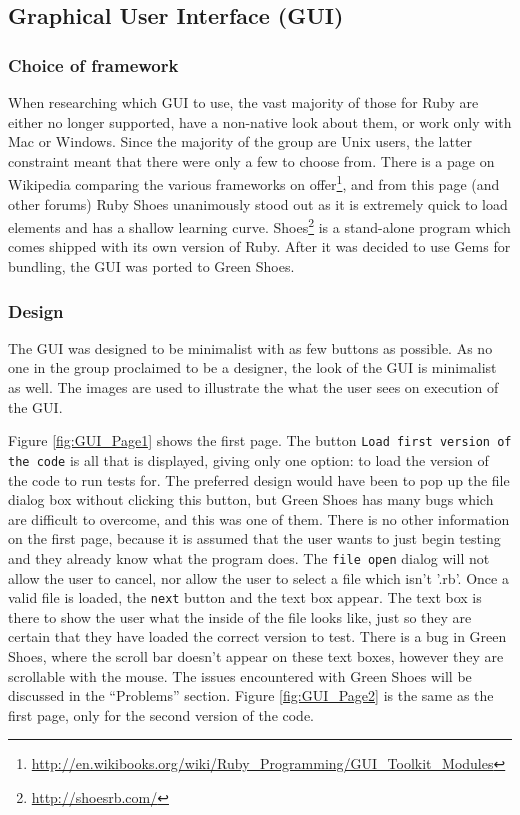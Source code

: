   \subsection{Graphical User Interface (GUI)}
  \subsubsection{Choice of framework}
  When researching which GUI to use, the vast majority of those for Ruby are either no longer supported, have a non-native look about them, or work only with Mac or Windows. Since the majority of the group are Unix users, the latter constraint meant that there were only a few to choose from. There is a page on Wikipedia comparing the various frameworks on offer\footnote{\url{http://en.wikibooks.org/wiki/Ruby_Programming/GUI_Toolkit_Modules}}, and from this page (and other forums) Ruby Shoes unanimously stood out as it is extremely quick to load elements and has a shallow learning curve.
  Shoes\footnote{\url{http://shoesrb.com/}} is a stand-alone program which comes shipped with its own version of Ruby. After it was decided to use Gems for bundling, the GUI was ported to Green Shoes.
  
  \subsubsection{Design}
  The GUI was designed to be minimalist with as few buttons as possible. As no one in the group proclaimed to be a designer, the look of the GUI is minimalist as well. The images are used to illustrate the what the user sees on execution of the GUI.
  
  Figure \ref{fig:GUI_Page1} shows the first page. The button \verb+Load first version of the code+ is all that is displayed, giving only one option: to load the version of the code to run tests for. The preferred design would have been to pop up the file dialog box without clicking this button, but Green Shoes has many bugs which are difficult to overcome, and this was one of them. There is no other information on the first page, because it is assumed that the user wants to just begin testing and they already know what the program does. The \verb+file open+ dialog will not allow the user to cancel, nor allow the user to select a file which isn't '.rb'. Once a valid file is loaded, the \verb+next+ button and the text box appear. The text box is there to show the user what the inside of the file looks like, just so they are certain that they have loaded the correct version to test. There is a bug in Green Shoes, where the scroll bar doesn't appear on these text boxes, however they are scrollable with the mouse. The issues encountered with Green Shoes will be discussed in the ``Problems'' section. Figure \ref{fig:GUI_Page2} is the same as the first page, only for the second version of the code.
  
